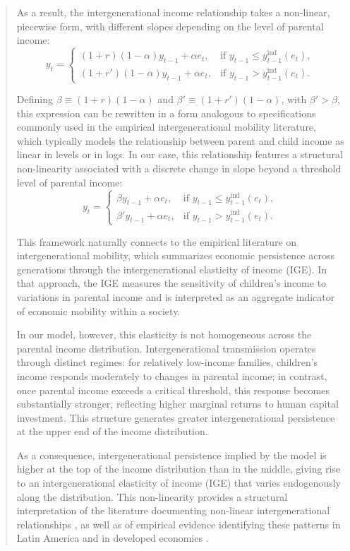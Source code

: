\documentclass[12pt]{article}
\begin{document}
\begin{abstract}
As a result, the intergenerational income relationship takes a non-linear, piecewise form, with different slopes depending on the level of parental income:
\[
y_t
=
\begin{cases}
(1+r)(1-\alpha)y_{t-1}+\alpha e_t,
& \text{if } y_{t-1}\leq y_{t-1}^{\text{ind}}(e_t), \\[0.4em]
(1+r')(1-\alpha)y_{t-1}+\alpha e_t,
& \text{if } y_{t-1}> y_{t-1}^{\text{ind}}(e_t).
\end{cases}
\]

Defining $\beta \equiv (1+r)(1-\alpha)$ and $\beta' \equiv (1+r')(1-\alpha)$, with $\beta' > \beta$, this expression can be rewritten in a form analogous to specifications commonly used in the empirical intergenerational mobility literature, which typically models the relationship between parent and child income as linear in levels or in logs. In our case, this relationship features a structural non-linearity associated with a discrete change in slope beyond a threshold level of parental income:
\[
y_t
=
\begin{cases}
\beta y_{t-1}+\alpha e_t,
& \text{if } y_{t-1}\leq y_{t-1}^{\text{ind}}(e_t), \\[0.4em]
\beta' y_{t-1}+\alpha e_t,
& \text{if } y_{t-1}> y_{t-1}^{\text{ind}}(e_t).
\end{cases}
\]

This framework naturally connects to the empirical literature on intergenerational mobility, which summarizes economic persistence across generations through the intergenerational elasticity of income (IGE). In that approach, the IGE measures the sensitivity of children’s income to variations in parental income and is interpreted as an aggregate indicator of economic mobility within a society.

In our model, however, this elasticity is not homogeneous across the parental income distribution. Intergenerational transmission operates through distinct regimes: for relatively low-income families, children’s income responds moderately to changes in parental income; in contrast, once parental income exceeds a critical threshold, this response becomes substantially stronger, reflecting higher marginal returns to human capital investment. This structure generates greater intergenerational persistence at the upper end of the income distribution.

As a consequence, intergenerational persistence implied by the model is higher at the top of the income distribution than in the middle, giving rise to an intergenerational elasticity of income (IGE) that varies endogenously along the distribution. This non-linearity provides a structural interpretation of the literature documenting non-linear intergenerational relationships \parencite{Black_2011,Durlauf_2018,Becker_2018}, as well as of empirical evidence identifying these patterns in Latin America \parencite{Leites_2022,Cortes_2024} and in developed economies \parencite{Bratsberg_2007,Berritela_2016,Gregg_2019}.


\end{abstract}
\end{document}
